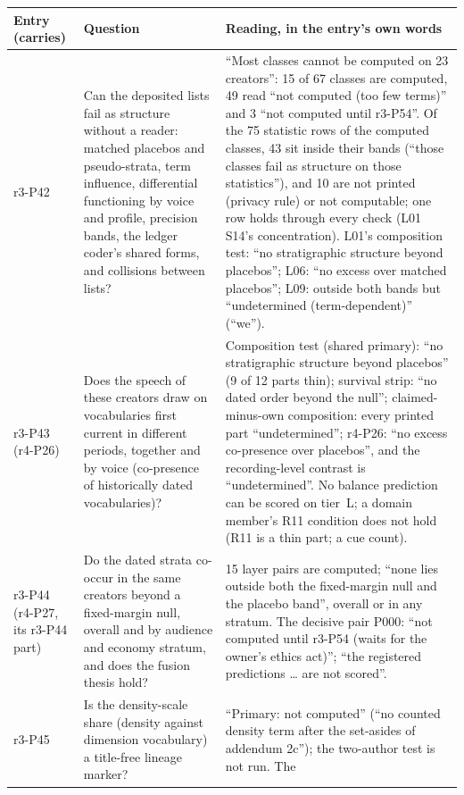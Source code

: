 \begin{table}[tp]
\centering
\footnotesize
\begin{tabular}{@{}>{\raggedright\arraybackslash}p{}>{\raggedright\arraybackslash}p{}p{}@{}}
\toprule
Entry (carries) & Question & Reading, in the entry's own words \\
\midrule
r3-P42 & Can the deposited lists fail as structure without a reader: matched placebos and pseudo-strata, term influence,
differential functioning by voice and profile, precision bands, the ledger coder's shared forms, and collisions between
lists? & ``Most classes cannot be computed on 23 creators'': 15 of 67 classes are computed, 49 read ``not computed (too
few terms)'' and 3 ``not computed until r3-P54''. Of the 75 statistic rows of the computed classes, 43 sit inside their
bands (``those classes fail as structure on those statistics''), and 10 are not printed (privacy rule) or not
computable; one row holds through every check (L01 S14's concentration). L01's composition test: ``no stratigraphic
structure beyond placebos''; L06: ``no excess over matched placebos''; L09: outside both bands but ``undetermined
(term-dependent)'' (``we''). \\
r3-P43 (r4-P26) & Does the speech of these creators draw on vocabularies first current in different periods, together
and by voice (co-presence of historically dated vocabularies)? & Composition test (shared primary): ``no stratigraphic
structure beyond placebos'' (9 of 12 parts thin); survival strip: ``no dated order beyond the null'';
claimed-minus-own composition: every printed part ``undetermined''; r4-P26: ``no excess co-presence over placebos'', and
the recording-level contrast is ``undetermined''. No balance prediction can be scored on tier~L; a domain member's R11
condition does not hold (R11 is a thin part; a cue count). \\
r3-P44 (r4-P27, its r3-P44 part) & Do the dated strata co-occur in the same creators beyond a fixed-margin null, overall
and by audience and economy stratum, and does the fusion thesis hold? & 15 layer pairs are computed; ``none lies outside
both the fixed-margin null and the placebo band'', overall or in any stratum. The decisive pair P000: ``not computed
until r3-P54 (waits for the owner's ethics act)''; ``the registered predictions \ldots{} are not scored''. \\
r3-P45 & Is the density-scale share (density against dimension vocabulary) a title-free lineage marker? & ``Primary: not
computed'' (``no counted density term after the set-asides of addendum 2c''); the two-author test is not run. The

\end{tabular}
\end{table}
